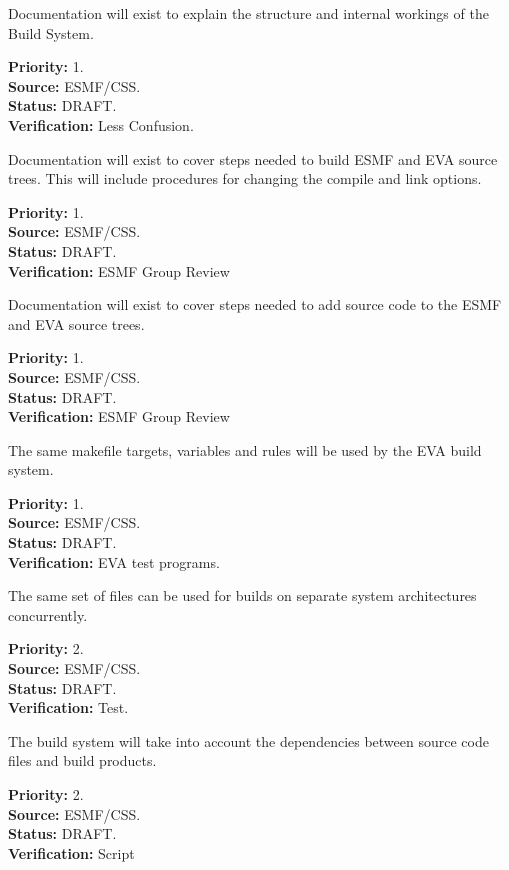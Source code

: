 Documentation will exist to explain the structure and 
internal workings of the Build System.
\begin{reqlist}
{\bf Priority:} 1. \\
{\bf Source:} ESMF/CSS. \\
{\bf Status:} DRAFT. \\
{\bf Verification:} Less Confusion.
\end{reqlist}

Documentation will exist to cover steps needed to build ESMF
and EVA source trees.  This will include procedures for 
changing the compile and link options.
\begin{reqlist}
{\bf Priority:} 1. \\
{\bf Source:} ESMF/CSS. \\
{\bf Status:} DRAFT. \\
{\bf Verification:} ESMF Group Review
\end{reqlist}

Documentation will exist to cover steps needed to add source
code to the ESMF and EVA source trees.
\begin{reqlist}
{\bf Priority:} 1. \\
{\bf Source:} ESMF/CSS. \\
{\bf Status:} DRAFT. \\
{\bf Verification:} ESMF Group Review
\end{reqlist}

The same makefile targets, variables and rules
will be used by the EVA build system.
\begin{reqlist}
{\bf Priority:} 1. \\
{\bf Source:} ESMF/CSS. \\
{\bf Status:} DRAFT. \\
{\bf Verification:} EVA test programs.
\end{reqlist}


The same set of files can be used for builds on separate 
system architectures concurrently.
\begin{reqlist}
{\bf Priority:} 2. \\
{\bf Source:} ESMF/CSS. \\
{\bf Status:} DRAFT. \\
{\bf Verification:} Test.
\end{reqlist}

The build system will take into account the dependencies 
between source code files and build products.  
\begin{reqlist}
{\bf Priority:} 2. \\
{\bf Source:} ESMF/CSS. \\
{\bf Status:} DRAFT. \\
{\bf Verification:} Script
\end{reqlist}

